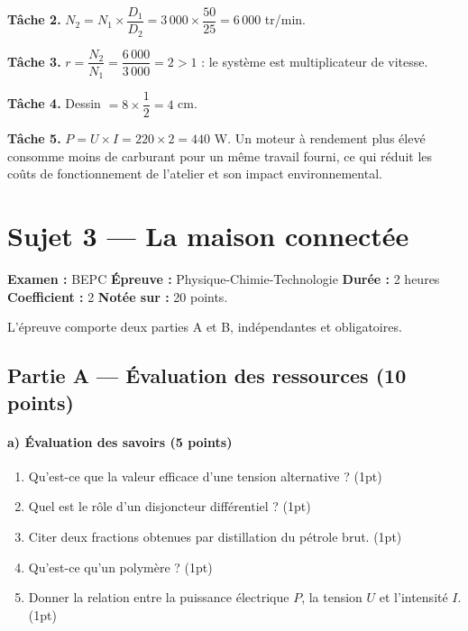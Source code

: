 \textbf{Tâche 2.} $N_2=N_1\times\dfrac{D_1}{D_2}=3\,000\times\dfrac{50}{25}=6\,000$
tr/min.

\textbf{Tâche 3.} $r=\dfrac{N_2}{N_1}=\dfrac{6\,000}{3\,000}=2>1$ : le système est
multiplicateur de vitesse.

\textbf{Tâche 4.} Dessin $=8\times\dfrac12=4$ cm.

\textbf{Tâche 5.} $P=U\times I=220\times2=440$ W. Un moteur à rendement plus élevé
consomme moins de carburant pour un même travail fourni, ce qui réduit les coûts de
fonctionnement de l'atelier et son impact environnemental.

\section{Sujet 3 — La maison connectée}

\noindent\textbf{Examen :} BEPC \quad\textbf{Épreuve :} Physique-Chimie-Technologie
\quad\textbf{Durée :} 2 heures \quad\textbf{Coefficient :} 2 \quad\textbf{Notée sur :}
20 points.
\par\smallskip\noindent
L'épreuve comporte deux parties A et B, indépendantes et obligatoires.

\subsection*{Partie A — Évaluation des ressources (10 points)}

\paragraph{a) Évaluation des savoirs (5 points)}
\begin{enumerate}[label=\arabic*)]
\item Qu'est-ce que la valeur efficace d'une tension alternative ? \hfill (1pt)
\item Quel est le rôle d'un disjoncteur différentiel ? \hfill (1pt)
\item Citer deux fractions obtenues par distillation du pétrole brut. \hfill (1pt)
\item Qu'est-ce qu'un polymère ? \hfill (1pt)
\item Donner la relation entre la puissance électrique $P$, la tension $U$ et l'intensité
$I$. \hfill (1pt)
\end{enumerate}

